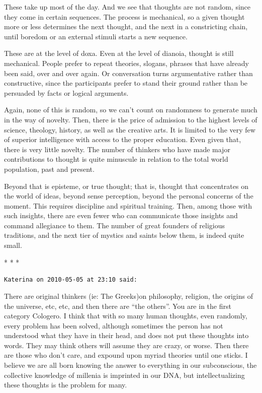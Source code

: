 These take up most of the day. And we see that thoughts are not random, since they come in certain sequences. The process is mechanical, so a given thought more or less determines the next thought, and the next in a constricting chain, until boredom or an external stimuli starts a new sequence.

These are at the level of doxa. Even at the level of dianoia, thought is still mechanical. People prefer to repeat theories, slogans, phrases that have already been said, over and over again. Or conversation turns argumentative rather than constructive, since the participants prefer to stand their ground rather than be persuaded by facts or logical arguments.

Again, none of this is random, so we can't count on randomness to generate much in the way of novelty. Then, there is the price of admission to the highest levels of science, theology, history, as well as the creative arts. It is limited to the very few of superior intelligence with access to the proper education. Even given that, there is very little novelty. The number of thinkers who have made major contributions to thought is quite minuscule in relation to the total world population, past and present.

Beyond that is episteme, or true thought; that is, thought that concentrates on the world of ideas, beyond sense perception, beyond the personal concerns of the moment. This requires discipline and spiritual training. Then, among those with such insights, there are even fewer who can communicate those insights and command allegiance to them. The number of great founders of religious traditions, and the next tier of mystics and saints below them, is indeed quite small.



\begin{center}* * *\end{center}

\begin{footnotesize}
\begin{sffamily}
\texttt{Katerina on 2010-05-05 at 23:10 said:}

There are original thinkers (ie: The Greeks)on philosophy, religion, the origins of the universe, etc, etc, and then there are ``the others''. You are in the first category Cologero. I think that with so many human thoughts, even randomly, every problem has been solved, although sometimes the person has not understood what they have in their head, and does not put these thoughts into words. They may think others will assume they are crazy, or worse. Then there are those who don't care, and expound upon myriad theories until one sticks. I believe we are all born knowing the answer to everything in our subconscious, the collective knowledge of millenia is imprinted in our DNA, but intellectualizing these thoughts is the problem for many.


\hfill

\end{sffamily}
\end{footnotesize}

